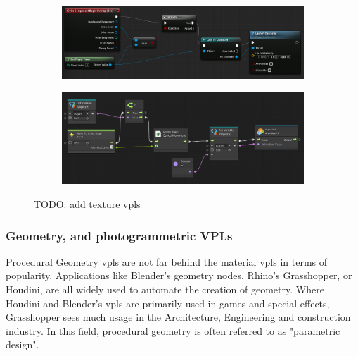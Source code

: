 \begin{figure}
\centering
\begin{subfigure}[b]{0.45\linewidth}
  \graphicspath{{../../assets/images/background/geo-vpl/}}
  \centering
  \includegraphics[width=\linewidth]{unreal-blueprints.jpg}
  \caption{}\label{fig:texture-vpl:1}
\end{subfigure}%
\qquad %
\begin{subfigure}[b]{0.45\linewidth}
  \graphicspath{{../../assets/images/background/geo-vpl/}}
  \centering
  \includegraphics[width=\linewidth]{unity-bolt-2.png}
  \caption{}\label{fig:texture-vpl:2}
\end{subfigure}%
\caption[Texture VPLs]{TODO: add texture vpls}
\label{fig:texture-vpl}
\end{figure}
    
\subsubsection*{Geometry, and photogrammetric VPLs}

Procedural Geometry \ac{vpl}s are not far behind the material \ac{vpl}s in terms of popularity.
Applications like Blender's geometry nodes, Rhino's Grasshopper, or Houdini, are all widely used to automate the creation of geometry. 
Where Houdini and Blender's vpls are primarily used in games and special effects, Grasshopper sees much usage in the Architecture, Engineering and construction industry. In this field, procedural geometry is often referred to as "parametric design".

